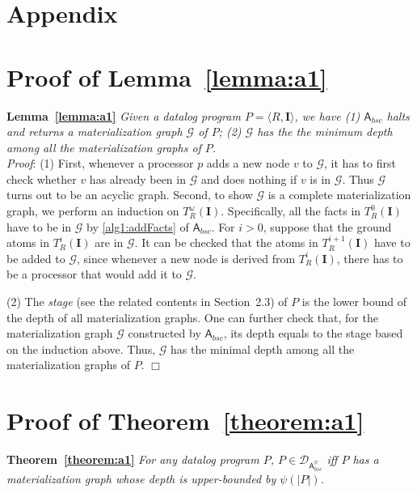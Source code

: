 \section*{Appendix}

\appendix

\section{Proof of Lemma~\ref{lemma:a1}}

\textbf{Lemma~\ref{lemma:a1}}
\emph{Given a datalog program $P=\langle R, \textbf{I}\rangle$, we have
(1) $\mathsf{A}_{bsc}$ halts and returns a materialization graph $\mathcal{G}$ of $P$;
(2) $\mathcal{G}$ has the the minimum depth among all the materialization graphs of $P$.}\\

\noindent\emph{Proof}:
(1) First, whenever a processor $p$ adds a new node $v$ to $\mathcal{G}$, it has to first
check whether $v$ has already been in $\mathcal{G}$ and does nothing if $v$ is in $\mathcal{G}$.
Thus $\mathcal{G}$ turns out to be an acyclic graph.
Second, to show $\mathcal{G}$ is a
complete materialization graph, we perform an induction on $T_R^{\omega}(\textbf{I})$.
Specifically, all the facts in $T_R^{0}(\textbf{I})$ have to be in $\mathcal{G}$ by \ref{alg1:addFacts}
of $\mathsf{A}_{bsc}$.
For $i>0$, suppose that the ground atoms in $T_R^{i}(\textbf{I})$ are in $\mathcal{G}$.
It can be checked that the atoms in $T_R^{i+1}(\textbf{I})$ have to be
added to $\mathcal{G}$, since whenever a new node is derived from $T_R^{i}(\textbf{I})$,
there has to be a processor that would add it to $\mathcal{G}$.

(2) The \emph{stage} (see the related contents in Section~2.3) of $P$ is the lower bound of the depth
of all materialization graphs. One can further check that, for the materialization graph $\mathcal{G}$
constructed by $\mathsf{A}_{bsc}$, its depth equals to the stage based on the induction above.
Thus, $\mathcal{G}$ has the minimal depth among all the materialization graphs of $P$. \hfill$\Box$

\section{Proof of Theorem~\ref{theorem:a1}}

\textbf{Theorem~\ref{theorem:a1}}
\emph{For any datalog program $P$, $P\in\mathcal{D}_{\mathsf{A}_{bsc}^{\psi}}$ iff
$P$ has a materialization graph whose depth is upper-bounded by $\psi(|P|)$.}\\

